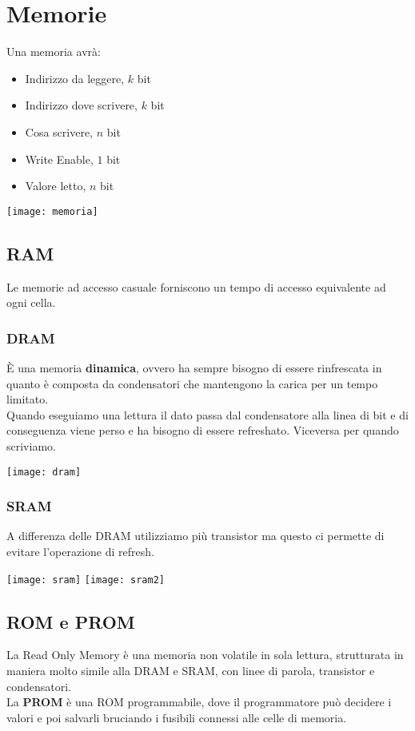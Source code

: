 \newpage
\section{Memorie}
Una memoria avrà:
\begin{itemize}
	\item Indirizzo da leggere, $k$ bit
	\item Indirizzo dove scrivere, $k$ bit
	\item Cosa scrivere, $n$ bit
	\item Write Enable, $1$ bit
	\item Valore letto, $n$ bit
\end{itemize}
\begin{center}
	\texttt{[image: memoria]}
\end{center}

\subsection{RAM}
Le memorie ad accesso casuale forniscono un tempo di accesso equivalente ad ogni cella.
\subsubsection{DRAM}
È una memoria \textbf{dinamica}, ovvero ha sempre bisogno di essere rinfrescata in quanto è composta da condensatori che mantengono la carica per un tempo limitato.\\
Quando eseguiamo una lettura il dato passa dal condensatore alla linea di bit e di conseguenza viene perso e ha bisogno di essere refreshato. Viceversa per quando scriviamo.
\begin{center}
	\texttt{[image: dram]}
\end{center}

\subsubsection{SRAM}
A differenza delle DRAM utilizziamo più transistor ma questo ci permette di evitare l'operazione di refresh.
\begin{center}
	\texttt{[image: sram]}
	\texttt{[image: sram2]}
\end{center}

\subsection{ROM e PROM}
La Read Only Memory è una memoria non volatile in sola lettura, strutturata in maniera molto simile alla DRAM e SRAM, con linee di parola, transistor e condensatori.\\
La \textbf{PROM} è una ROM programmabile, dove il programmatore può decidere i valori e poi salvarli bruciando i fusibili connessi alle celle di memoria.

